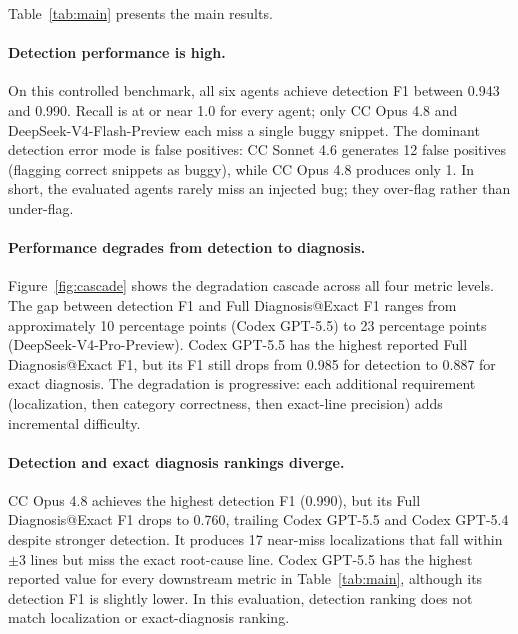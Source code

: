 \documentclass[11pt]{article}
\begin{document}
Table~\ref{tab:main} presents the main results.

\paragraph{Detection performance is high.}
On this controlled benchmark, all six agents achieve detection F1 between 0.943 and 0.990. Recall is at or near 1.0 for every agent; only CC Opus 4.8 and DeepSeek-V4-Flash-Preview each miss a single buggy snippet. The dominant detection error mode is false positives: CC Sonnet 4.6 generates 12 false positives (flagging correct snippets as buggy), while CC Opus 4.8 produces only 1. In short, the evaluated agents rarely miss an injected bug; they over-flag rather than under-flag.

\paragraph{Performance degrades from detection to diagnosis.}
Figure~\ref{fig:cascade} shows the degradation cascade across all four metric levels. The gap between detection F1 and Full Diagnosis@Exact F1 ranges from approximately 10 percentage points (Codex GPT-5.5) to 23 percentage points (DeepSeek-V4-Pro-Preview). Codex GPT-5.5 has the highest reported Full Diagnosis@Exact F1, but its F1 still drops from 0.985 for detection to 0.887 for exact diagnosis. The degradation is progressive: each additional requirement (localization, then category correctness, then exact-line precision) adds incremental difficulty.

\paragraph{Detection and exact diagnosis rankings diverge.}
CC Opus 4.8 achieves the highest detection F1 (0.990), but its Full Diagnosis@Exact F1 drops to 0.760, trailing Codex GPT-5.5 and Codex GPT-5.4 despite stronger detection. It produces 17 near-miss localizations that fall within $\pm$3 lines but miss the exact root-cause line. Codex GPT-5.5 has the highest reported value for every downstream metric in Table~\ref{tab:main}, although its detection F1 is slightly lower. In this evaluation, detection ranking does not match localization or exact-diagnosis ranking.
\end{document}
